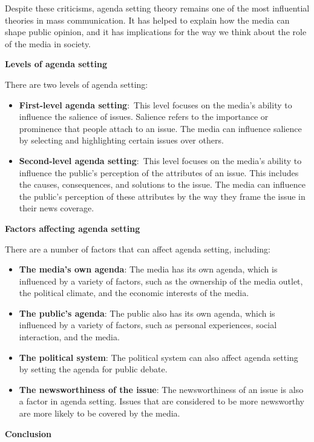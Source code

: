 \documentclass[
]{book}
\begin{document}
Despite these criticisms, agenda setting theory remains one of the most influential theories in mass communication. It has helped to explain how the media can shape public opinion, and it has implications for the way we think about the role of the media in society.

\textbf{Levels of agenda setting}

There are two levels of agenda setting:

\begin{itemize}
\item
  \textbf{First-level agenda setting}:~This level focuses on the media's ability to influence the salience of issues. Salience refers to the importance or prominence that people attach to an issue. The media can influence salience by selecting and highlighting certain issues over others.
\item
  \textbf{Second-level agenda setting}:~This level focuses on the media's ability to influence the public's perception of the attributes of an issue. This includes the causes, consequences, and solutions to the issue. The media can influence the public's perception of these attributes by the way they frame the issue in their news coverage.
\end{itemize}

\textbf{Factors affecting agenda setting}

There are a number of factors that can affect agenda setting, including:

\begin{itemize}
\item
  \textbf{The media's own agenda}: The media has its own agenda, which is influenced by a variety of factors, such as the ownership of the media outlet, the political climate, and the economic interests of the media.
\item
  \textbf{The public's agenda}: The public also has its own agenda, which is influenced by a variety of factors, such as personal experiences, social interaction, and the media.
\item
  \textbf{The political system}: The political system can also affect agenda setting by setting the agenda for public debate.
\item
  \textbf{The newsworthiness of the issue}: The newsworthiness of an issue is also a factor in agenda setting. Issues that are considered to be more newsworthy are more likely to be covered by the media.
\end{itemize}

\textbf{Conclusion}
\end{document}
